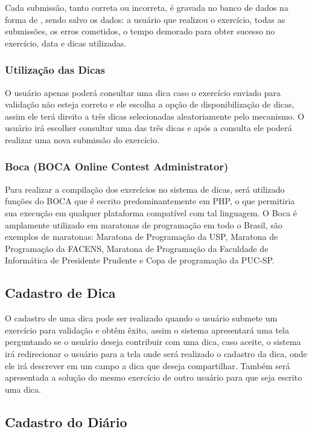 Cada submissão, tanto correta ou incorreta, é gravada no banco de dados na forma de , sendo salvo os dados: a usuário que realizou o exercício, todas as submissões, os erros cometidos, o tempo demorado para obter sucesso no exercício, data e dicas utilizadas.

\subsubsection{Utilização das Dicas}

O usuário apenas poderá consultar uma dica caso o exercício enviado para validação não esteja correto e ele escolha a opção de disponibilização de dicas, assim ele terá direito a três dicas selecionadas aleatoriamente pelo mecanismo. O usuário irá escolher consultar uma das três dicas e após a consulta ele poderá realizar uma nova submissão do exercício.

\subsubsection{Boca (BOCA Online Contest Administrator)}

Para realizar a compilação dos exercícios no sistema de dicas, será utilizado funções do  BOCA  que é escrito predominantemente em PHP, o que permitiria sua execução em qualquer plataforma compatível com tal linguagem. O Boca é amplamente utilizado em maratonas de programação em todo o Brasil, são exemplos de maratonas: Maratona de Programação da USP, Maratona de Programação da FACENS, Maratona de Programação da Faculdade de Informática de Presidente Prudente e Copa de programação da PUC-SP. 

\subsection{Cadastro de Dica}

O cadastro de uma dica pode ser realizado quando o usuário submete um exercício para validação e obtêm êxito, assim o sistema apresentará uma tela perguntando se o usuário deseja contribuir com uma dica, caso aceite, o sistema irá redirecionar o usuário para a tela onde será realizado o cadastro da dica, onde ele irá descrever em um campo a dica que deseja compartilhar. Também será apresentada a solução do mesmo exercício de outro usuário para que seja escrito uma dica. 

\subsection{Cadastro do Diário}

